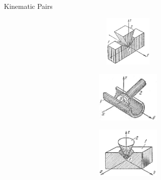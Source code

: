 \documentclass[aspectratio=169]{beamer}
\begin{document}
\begin{frame}[t]{Kinematic Pairs}
\begin{figure}[H]
        \begin{subfigure}{0.32\textwidth}
            \centering\includegraphics[height=2.5cm,width=1\textwidth,keepaspectratio]{hkp_4.png}
            \label{fig:hkp_4.png}
        \end{subfigure}
        \begin{subfigure}{0.32\textwidth}
            \centering\includegraphics[height=2.5cm,width=1\textwidth,keepaspectratio]{hkp_5.png}
            \label{fig:hkp_5.png}
        \end{subfigure}
        \begin{subfigure}{0.32\textwidth}
            \centering\includegraphics[height=2.5cm,width=1\textwidth,keepaspectratio]{hkp_6.png}
            \label{fig:hkp_6.png}
        \end{subfigure}
    \end{figure}
\end{frame}
\end{document}
